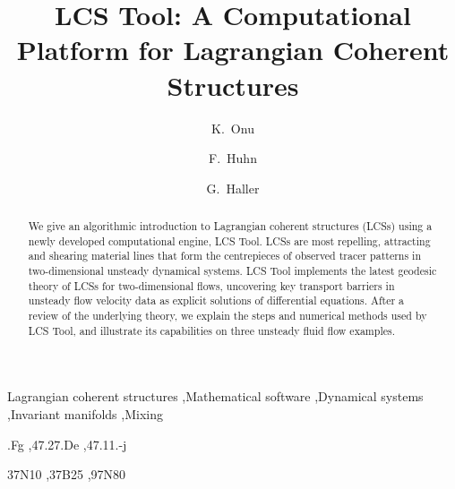 \documentclass{elsarticle}
\begin{document}
\begin{frontmatter}

\title{LCS Tool: A Computational Platform for Lagrangian Coherent Structures}

\author{K.~Onu}

\author{F.~Huhn}

\author{G.~Haller}


\address{Institute of Mechanical Systems, ETH Zurich, Switzerland}

\begin{abstract}
We give an algorithmic introduction to Lagrangian coherent structures (LCSs) using a newly developed computational engine, LCS Tool. LCSs are most repelling, attracting and shearing material lines that form the centrepieces of observed tracer patterns in two-dimensional unsteady dynamical systems. LCS Tool implements the latest geodesic theory of LCSs for two-dimensional flows, uncovering key transport barriers in unsteady flow velocity data as explicit solutions of differential equations. After a review of the underlying theory, we explain the steps and numerical methods used by LCS Tool, and illustrate its capabilities on three unsteady fluid flow examples.
\end{abstract}

\begin{keyword}
Lagrangian coherent structures \sep Mathematical software \sep Dynamical systems \sep Invariant manifolds \sep Mixing

.Fg \sep 47.27.De \sep 47.11.-j

\MSC[2010] 37N10 \sep 37B25 \sep 97N80
\end{keyword}

\end{frontmatter}
\end{document}
